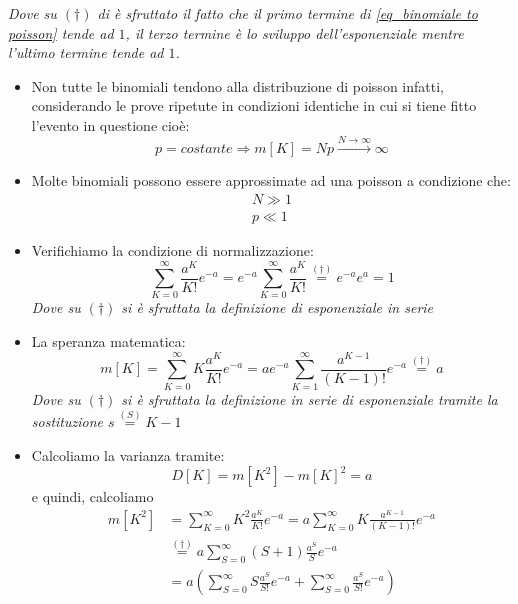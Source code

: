 \documentclass[11pt,a4paper]{book}
\begin{document}
\textit{Dove su $ (\dag) $ di è sfruttato il fatto che il primo termine di \eqref{eq_binomiale to poisson} tende ad $ 1 $, il terzo termine è lo sviluppo dell'esponenziale mentre l'ultimo termine tende ad $ 1 $.}\\
\begin{itemize}
\item Non tutte le binomiali tendono alla distribuzione di poisson infatti, considerando le prove ripetute in condizioni identiche in cui si tiene fitto l'evento in questione cioè:
\begin{equation}
p = \textit{costante} \Rightarrow m[K] = Np \xrightarrow{N \to \infty} \infty
\end{equation}
\item  Molte binomiali possono essere approssimate ad una poisson a condizione che:
\begin{eqnarray}
N \gg 1 \\
p \ll 1
\end{eqnarray}
\item Verifichiamo la condizione di normalizzazione:
\begin{equation}
\sum\limits_{K = 0}^{\infty}\frac{a^K}{K!}e^{-a} = e^{-a}\sum\limits_{K = 0}^{\infty} \frac{a^K}{K!} \stackrel{(\dag)}{=} e^{-a} e^a = 1
\end{equation}
\textit{Dove su $ (\dag) $ si è sfruttata la definizione di esponenziale in serie}
\item La speranza matematica:
\begin{equation}
m[K] = \sum\limits_{K = 0}^{\infty} K\frac{a^K}{K!}e^{-a} = a e^{-a} \sum\limits_{K = 1}^{\infty} \frac{a^{K-1}}{(K-1)!}e^{-a} \stackrel{(\dag)}{=} a
\end{equation}
\textit{Dove su $ (\dag) $ si è sfruttata la definizione in serie di esponenziale tramite la sostituzione $ s \stackrel{(S)}{=} K-1 $}
\item Calcoliamo la varianza tramite:
\begin{equation}
D[K] = m[K^2]-m[K]^2 = a
\end{equation}
e quindi, calcoliamo
\begin{align}
m[K^2] &=  \sum\limits_{K = 0}^{\infty} K^2 \frac{a^K}{K!}e^{-a} = a  \sum\limits_{K = 0}^{\infty} K \frac{a^{K-1}}{(K-1)!}e^{-a} \\
& \stackrel{(\dag)}{=} a \sum\limits_{S = 0}^{\infty} \left(S+1 \right) \frac{a^S}{S}e^{-a} \\
& = a\left( \sum\limits_{S = 0}^{\infty} S \frac{a^S}{S!}e^{-a}+\sum\limits_{S = 0}^{\infty} \frac{a^S}{S!}e^{-a}  \right) \\

\end{align}
\end{itemize}
\end{document}
